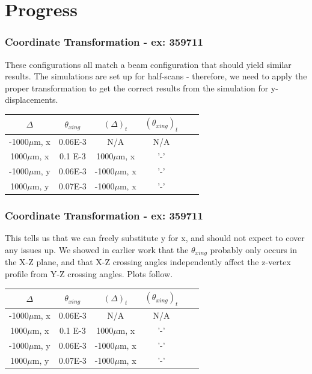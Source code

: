 \section{Progress}
\label{sec:progress}

\begin{frame}
  \frametitle{Coordinate Transformation - ex: 359711}
  These configurations all match a beam configuration that should yield similar
  results. The simulations are set up for half-scans - therefore, we need to
  apply the proper transformation to get the correct results from the
  simulation for y-displacements.
  \begin{center}
    \begin{tabular}{c c c c c c}
      \toprule
      \textbf{$\Delta$}
      & \textbf{$\theta_{xing}$}
      & \textbf{$(\Delta)_t$}
      & \textbf{$(\theta_{xing})_t$} \\
      \midrule
        -1000$\mu$m, x & 0.06E-3 & N/A           & N/A \\
         1000$\mu$m, x & 0.1 E-3 & 1000$\mu$m, x & '-' \\
        -1000$\mu$m, y & 0.06E-3 &-1000$\mu$m, x & '-' \\
         1000$\mu$m, y & 0.07E-3 &-1000$\mu$m, x & '-' \\
      \bottomrule
    \end{tabular}
  \end{center}
\end{frame}

\begin{frame}
  \frametitle{Coordinate Transformation - ex: 359711}
  This tells us that we can freely substitute y for x, and should not expect to
  cover any issues up. We showed in earlier work that the $\theta_{xing}$
  probably only occurs in the X-Z plane, and that X-Z crossing angles
  independently affect the z-vertex profile from Y-Z crossing angles.
  Plots follow.
  \begin{center}
    \begin{tabular}{c c c c c c}
      \toprule
      \textbf{$\Delta$}
      & \textbf{$\theta_{xing}$}
      & \textbf{$(\Delta)_t$}
      & \textbf{$(\theta_{xing})_t$} \\
      \midrule
      -1000$\mu$m, x & 0.06E-3 & N/A           & N/A \\
      1000$\mu$m, x & 0.1 E-3 & 1000$\mu$m, x & '-' \\
      -1000$\mu$m, y & 0.06E-3 &-1000$\mu$m, x & '-' \\
      1000$\mu$m, y & 0.07E-3 &-1000$\mu$m, x & '-' \\
      \bottomrule
    \end{tabular}
  \end{center}
\end{frame}

